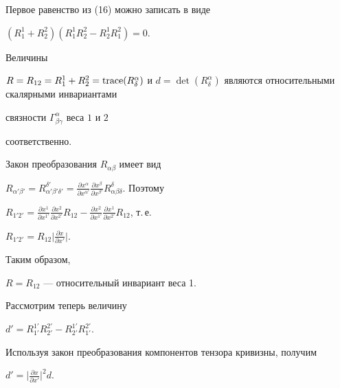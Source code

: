 Первое равенство из (16) можно записать в виде


$(R^1_1+ R^2_2)( R^1_1R^2_2- R^1_2R^2_1)=0$.





\begin{prop}


Величины


$R=R_{12}=R^1_1+R^2_2=\trace(R^{\alpha}_{\delta})$ и $d=\det({


R^{\alpha}_{\delta}})$ являются относительными скалярными инвариантами


связности $\Gamma^{\alpha}_{\beta \gamma} $ веса $1$ и $2$


соответственно.


\end{prop}





\begin{pf}


Закон преобразования $R_{\alpha \beta}$ имеет вид


$R_{\alpha' \beta'}=R^{\delta'}_{\alpha'\beta' \delta'}=


\frac{\partial x^{\alpha}}{\partial x^{\alpha'}}


\frac{\partial x^{\beta}}{\partial x^{\beta'}}


R^{\delta}_{\alpha\beta \delta}$. Поэтому


$R_{1' 2'}=\frac{\partial x^{1}}{\partial x^{1'}}


\frac{\partial


x^{2}}{\partial x^{2'}} R_{12}-\frac{\partial x^{2}}{\partial


x^{1'}}\frac{\partial x^{1}}{\partial x^{2'}} R_{12}$, т.\,е.


$R_{1'2'}=R_{12}\big|\frac{\partial x}{\partial x'}\big|$.


Таким образом,


$R=R_{12}$ --- относительный инвариант веса 1.





Рассмотрим теперь величину


$d'=R^{1'}_{1'}R^{2'}_{2'}- R^{1'}_{2'}R^{2'}_{1'}$.


Используя закон преобразования компонентов тензора кривизны, получим


$d'=\big|\frac{\partial x}{\partial x'}\big|^2d$.


\end{pf}





